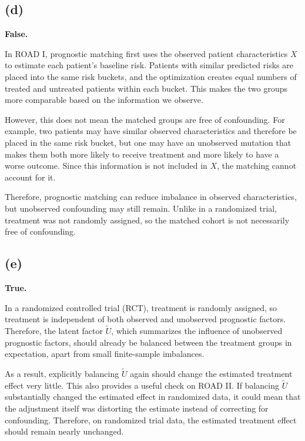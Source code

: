 \documentclass{article}
\begin{document}
\vspace{5mm}
\subsection*{(d)}


\textbf{False.}

In ROAD I, prognostic matching first uses the observed patient characteristics $X$ to estimate each patient's baseline risk. Patients with similar predicted risks are placed into the same risk buckets, and the optimization creates equal numbers of treated and untreated patients within each bucket. This makes the two groups more comparable based on the information we observe.

However, this does not mean the matched groups are free of confounding. For example, two patients may have similar observed characteristics and therefore be placed in the same risk bucket, but one may have an unobserved mutation that makes them both more likely to receive treatment and more likely to have a worse outcome. Since this information is not included in $X$, the matching cannot account for it.

Therefore, prognostic matching can reduce imbalance in observed characteristics, but unobserved confounding may still remain. Unlike in a randomized trial, treatment was not randomly assigned, so the matched cohort is not necessarily free of confounding.



\vspace{5mm}
\subsection*{(e)}


\textbf{True.}

In a randomized controlled trial (RCT), treatment is randomly assigned, so treatment is independent of both observed and unobserved prognostic factors. Therefore, the latent factor $\tilde{U}$, which summarizes the influence of unobserved prognostic factors, should already be balanced between the treatment groups in expectation, apart from small finite-sample imbalances.

As a result, explicitly balancing $\tilde{U}$ again should change the estimated treatment effect very little. This also provides a useful check on ROAD II. If balancing $\tilde{U}$ substantially changed the estimated effect in randomized data, it could mean that the adjustment itself was distorting the estimate instead of correcting for confounding. Therefore, on randomized trial data, the estimated treatment effect should remain nearly unchanged.
\end{document}
